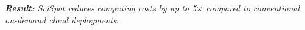 \noindent \emph{\textbf{Result:} SciSpot reduces computing costs by up to 5$\times$ compared to conventional on-demand cloud deployments.}









